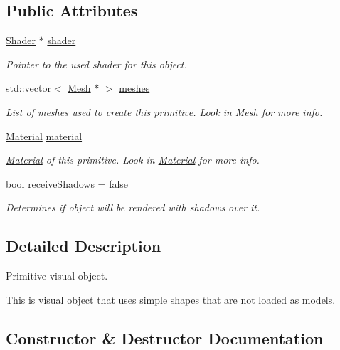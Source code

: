 \subsection*{Public Attributes}
\begin{DoxyCompactItemize}
\item 
\mbox{\hyperlink{class_shader}{Shader}} $\ast$ \mbox{\hyperlink{class_primitive_visual_a463e83ee34d0727a19cf417f74ea67e7}{shader}}
\begin{DoxyCompactList}\small\item\em Pointer to the used shader for this object. \end{DoxyCompactList}\item 
std\+::vector$<$ \mbox{\hyperlink{class_mesh}{Mesh}} $\ast$ $>$ \mbox{\hyperlink{class_primitive_visual_a12252f7d680eb47471a13d121c0898d5}{meshes}}
\begin{DoxyCompactList}\small\item\em List of meshes used to create this primitive. Look in \mbox{\hyperlink{class_mesh}{Mesh}} for more info. \end{DoxyCompactList}\item 
\mbox{\hyperlink{struct_material}{Material}} \mbox{\hyperlink{class_primitive_visual_a775945d5dc204a98315eda90d6482278}{material}}
\begin{DoxyCompactList}\small\item\em \mbox{\hyperlink{struct_material}{Material}} of this primitive. Look in \mbox{\hyperlink{struct_material}{Material}} for more info. \end{DoxyCompactList}\item 
bool \mbox{\hyperlink{class_primitive_visual_ab3f6291a1a2914f0403ae118f8d9d8e5}{receive\+Shadows}} = false
\begin{DoxyCompactList}\small\item\em Determines if object will be rendered with shadows over it. \end{DoxyCompactList}\end{DoxyCompactItemize}


\subsection{Detailed Description}
Primitive visual object. 

This is visual object that uses simple shapes that are not loaded as models. 

\subsection{Constructor \& Destructor Documentation}
\mbox{\label{class_primitive_visual_a8198e82c2dc99af36b96a2ad35ec36aa}} 
